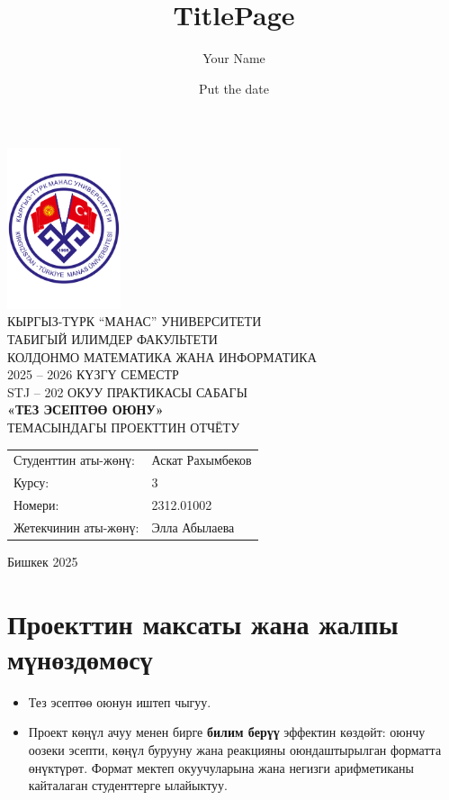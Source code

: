 \documentclass[12pt]{article}
\title{TitlePage}
\author{Your Name}
\date{Put the date}
\begin{document}
\begin{titlepage}
\begin{center}

    \includegraphics[width=0.25\textwidth]{Manas_logo.pdf} \\[1cm]
    
    \Large
    КЫРГЫЗ-ТҮРК ``МАНАС'' УНИВЕРСИТЕТИ \\[0.2cm]
    ТАБИГЫЙ ИЛИМДЕР ФАКУЛЬТЕТИ \\[0.2cm]
    КОЛДОНМО МАТЕМАТИКА ЖАНА ИНФОРМАТИКА \\[1cm]
    
    \Large
    2025 -- 2026 КҮЗГҮ СЕМЕСТР \\[0.5cm]
    STJ -- 202 ОКУУ ПРАКТИКАСЫ САБАГЫ \\[1cm]
    
    \large
    \textbf{«ТЕЗ ЭСЕПТӨӨ ОЮНУ»} \\[0.3cm]
    ТЕМАСЫНДАГЫ ПРОЕКТТИН ОТЧЁТУ \\[1cm]
    
\end{center}

\raggedright
\large
\begin{tabular}{ll}
Студенттин аты-жөнү: & Аскат Рахымбеков \\[0.5cm]
Курсу: & 3 \\[0.5cm]
Номери: & 2312.01002 \\[1cm]
Жетекчинин аты-жөнү: & Элла Абылаева \\[1.5cm]
\end{tabular}

\begin{center}
Бишкек 2025
\end{center}

\end{titlepage}

\section{Проекттин максаты жана жалпы мүнөздөмөсү}
\begin{itemize}
    \item Тез эсептөө оюнун иштеп чыгуу.
    \item Проект көңүл ачуу менен бирге \textbf{билим берүү} эффектин көздөйт: оюнчу оозеки эсепти, көңүл бурууну жана реакцияны оюндаштырылган форматта өнүктүрөт. Формат мектеп окуучуларына жана негизги арифметиканы кайталаган студенттерге ылайыктуу.
\end{itemize}
\end{document}
